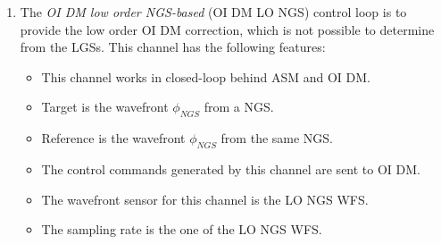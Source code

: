\begin{enumerate}
	\item The \emph{OI DM low order NGS-based} (OI DM LO NGS) control loop is
	to provide the low order OI DM correction, which is not possible to
	determine from the LGSs.  
	This channel has the following features:
	\begin{itemize}
		\item This channel works in closed-loop behind ASM and OI DM.
		\item Target is the wavefront $\phi_{NGS}$ from a NGS.
		\item Reference is the wavefront $\phi_{NGS}$ from the same NGS.
		\item The control commands generated by this channel are sent to OI DM.
	  \item The wavefront sensor for this channel is the LO NGS WFS.
		\item The sampling rate is the one of the LO NGS WFS.
	\end{itemize}

\end{enumerate}

